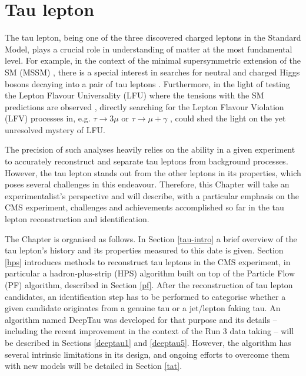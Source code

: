 \chapter{Tau lepton}\label{sec:tau}

The tau lepton, being one of the three discovered charged leptons in the Standard Model, plays a crucial role in understanding of matter at the most fundamental level. For example, in the context of the minimal supersymmetric extension of the SM (MSSM) \cite{Fayet:1974pd, Fayet:1977yc}, there is a special interest in searches for neutral and charged Higgs bosons decaying into a pair of tau leptons \cite{CMS:2022goy}. Furthermore, in the light of testing the Lepton Flavour Universality (LFU) \cite{HFLAV:2022pwe} where the tensions with the SM predictions are observed \cite{Cheaib:2022ral, LHCb:2021trn}, directly searching for the Lepton Flavour Violation (LFV) processes in, e.g. $\tau \to 3\mu$ \cite{CMS:2020kwy} or $\tau \to \mu + \gamma$  \cite{Konno:2020tmf}, could shed the light on the yet unresolved mystery of LFU.

The precision of such analyses heavily relies on the ability in a given experiment to accurately reconstruct and separate tau leptons from background processes. However, the tau lepton stands out from the other leptons in its properties, which poses several challenges in this endeavour. Therefore, this Chapter will take an experimentalist’s perspective and will describe, with a particular emphasis on the CMS experiment, challenges and achievements accomplished so far in the tau lepton reconstruction and identification.

The Chapter is organised as follows. In Section \ref{tau-intro} a brief overview of the tau lepton’s history and its properties measured to this date is given. Section \ref{hps} introduces methods to reconstruct tau leptons in the CMS experiment, in particular a hadron-plus-strip (HPS) algorithm built on top of the Particle Flow (PF) algorithm, described in Section \ref{pf}. After the reconstruction of tau lepton candidates, an identification step has to be performed to categorise whether a given candidate originates from a genuine tau or a jet/lepton faking tau. An algorithm named DeepTau was developed for that purpose and its details -- including the recent improvement in the context of the Run 3 data taking -- will be described in Sections \ref{deeptau1} and \ref{deeptau5}. However, the algorithm has several intrinsic limitations in its design, and ongoing efforts to overcome them with new models will be detailed in Section \ref{tat}.

